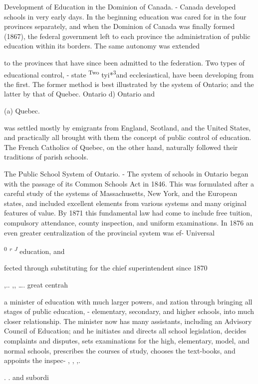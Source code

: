 \documentclass[]{book}
\begin{document}
Development of Education in the Dominion of Canada. - Canada developed schools in very early days. In the beginning education was cared for in the four provinces separately, and when the Dominion of Canada was finally formed (1867), the federal government left to each province the administration of public education within its borders. The same autonomy was extended

to the provinces that have since been admitted to the federation. Two types of educational control, - state \textsuperscript{Two} tyi*\textsuperscript{3}and ecclesiastical, have been developing from the first. The former method is best illustrated by the system of Ontario; and the latter by that of Quebec. Ontario d) Ontario and

(a) Quebec.

was settled mostly by emigrants from England, Scotland, and the United States, and practically all brought with them the concept of public control of education. The French Catholics of Quebec, on the other hand, naturally followed their traditions of parish schools.

The Public School System of Ontario. - The system of schools in Ontario began with the passage of its Common Schools Act in 1846. This was formulated after a careful study of the systems of Massachusetts, New York, and the European states, and included excellent elements from various systems and many original features of value. By 1871 this fundamental law had come to include free tuition, compulsory attendance, county inspection, and uniform examinations. In 1876 an even greater centralization of the provincial system was ef- Universal

\textsuperscript{0} \emph{\textsuperscript{r} \textsuperscript{J}} education, and

fected through substituting for the chief superintendent since 1870

,.. ,, \ldots{}. great centrah

a minister of education with much larger powers, and zation through bringing all stages of public education, - elementary, secondary, and higher schools, into much closer relationship. The minister now has many assistants, including an Advisory Council of Education; and he initiates and directs all school legislation, decides complaints and disputes, sets examinations for the high, elementary, model, and normal schools, prescribes the courses of study, chooses the text-books, and appoints the inspec- , , ,.

. . and subordi
\end{document}
